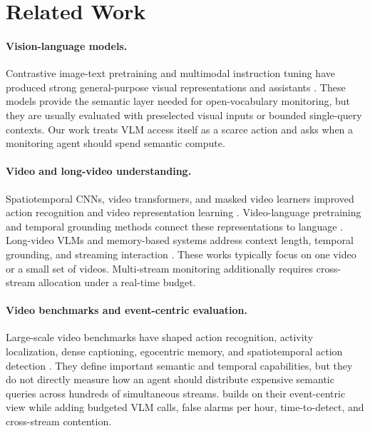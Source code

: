 \section{Related Work}

\paragraph{Vision-language models.}
Contrastive image-text pretraining and multimodal instruction tuning have produced strong general-purpose visual representations and assistants \citep{radford2021clip,jia2021align,zhai2022lit,alayrac2022flamingo,wang2022ofa,chen2023pali,wang2023beit3,zhai2023siglip,li2022blip,li2023blip2,dai2023instructblip,liu2023llava,lu2023unifiedio}. These models provide the semantic layer needed for open-vocabulary monitoring, but they are usually evaluated with preselected visual inputs or bounded single-query contexts. Our work treats VLM access itself as a scarce action and asks when a monitoring agent should spend semantic compute.

\paragraph{Video and long-video understanding.}
Spatiotemporal CNNs, video transformers, and masked video learners improved action recognition and video representation learning \citep{tran2015c3d,carreira2017quo,feichtenhofer2019slowfast,bertasius2021timesformer,arnab2021vivit,liu2022videoswin,tong2022videomae,tong2023videomaev2}. Video-language pretraining and temporal grounding methods connect these representations to language \citep{lei2021clipbert,bain2021frozen,huang2024vtimellm}. Long-video VLMs and memory-based systems address context length, temporal grounding, and streaming interaction \citep{song2024moviechat,chen2024videollmonline,mangalam2023egoschema,fu2025videomme}. These works typically focus on one video or a small set of videos. Multi-stream monitoring additionally requires cross-stream allocation under a real-time budget.

\paragraph{Video benchmarks and event-centric evaluation.}
Large-scale video benchmarks have shaped action recognition, activity localization, dense captioning, egocentric memory, and spatiotemporal action detection \citep{caba2015activitynet,krishna2017dense,sigurdsson2016hollywood,goyal2017something,gu2018ava,grauman2022ego4d}. They define important semantic and temporal capabilities, but they do not directly measure how an agent should distribute expensive semantic queries across hundreds of simultaneous streams. \benchmark builds on their event-centric view while adding budgeted VLM calls, false alarms per hour, time-to-detect, and cross-stream contention.

